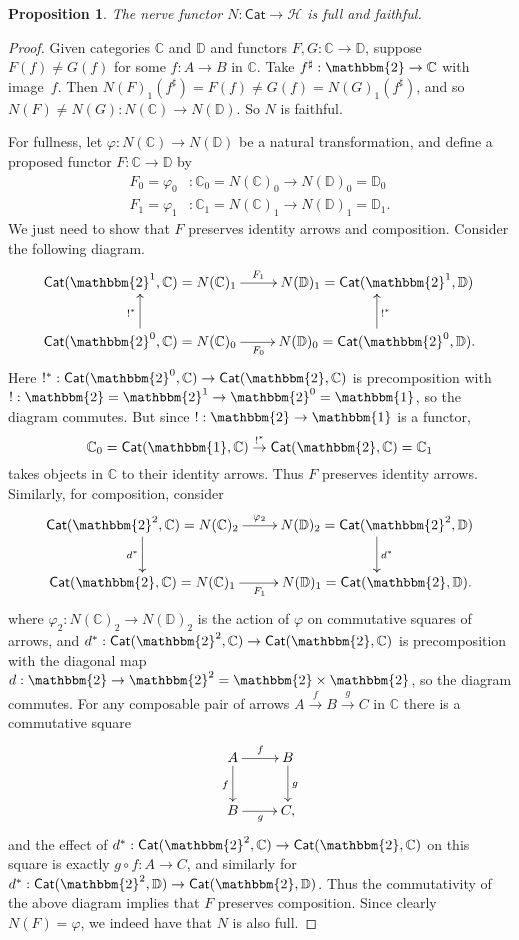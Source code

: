 \documentclass[11pt]{article}
\newcommand{\bbtwo}{\ensuremath{\mathbbm{2}}}
\newcommand{\C}{\ensuremath{\mathbb{C}}}
\newcommand{\D}{\ensuremath{\mathbb{D}}}
\newcommand{\Cat}{\ensuremath{\mathsf{Cat}}}
\newcommand{\HH}{\ensuremath{\mathcal{H}}}
\newtheorem{proposition}[theorem]{Proposition}
\theoremstyle{remark}
\theoremstyle{definition}
\begin{document}
\begin{proposition}
The nerve functor $N : \Cat \to \HH$ is full and faithful.
\end{proposition}
\begin{proof}
Given categories $\C$ and $\D$ and functors $F, G : \C\to\D$, suppose $F(f) \neq G(f)$ for some $f : A\to B$ in $\C$.  Take $f^{\sharp} : \bbtwo \to \C$ with image~$f$.  Then $N(F)_1(f^\sharp) = F(f) \neq G(f) = N(G)_1(f^\sharp)$, and so $N(F) \neq N(G) : N(\C)\to N(\D)$.  So $N$ is faithful.

For fullness, let $\varphi : N(\C) \to N(\D)$ be a natural transformation, and define a proposed functor $F : \C\to \D$ by  
\begin{align*}
F_0 = \varphi_0 &: \C_0 = N(\C)_0 \to N(\D)_0 = \D_0\\
F_1 = \varphi_1 &: \C_1 = N(\C)_1 \to N(\D)_1 = \D_1.
 \end{align*}
We just need to show that $F$ preserves identity arrows and composition.
Consider the following diagram.
\[
\xymatrix{
\Cat(\bbtwo^1, \C) = N(\C)_1 \ar[r]^{F_1} & N(\D)_1 = \Cat(\bbtwo^1, \D) \\
\Cat(\bbtwo^0, \C) = N(\C)_0 \ar[u]^{!^*} \ar[r]_{F_0} & N(\D)_0 = \Cat(\bbtwo^0, \D) \ar[u]_{!^*}.
}
\]
Here $!^* : \Cat(\bbtwo^0, \C) \to \Cat(\bbtwo, \C) $ is precomposition with $! : \bbtwo = \bbtwo^1 \rightarrow \bbtwo^0 = \mathbbm{1}$, so the diagram commutes.  But since $! : \bbtwo \rightarrow \mathbbm{1}$ is a functor, $$\C_0 = \Cat(\mathbbm{1}, \C)  \stackrel{!^*}{\to}  \Cat(\bbtwo, \C) = \C_1$$ takes objects in $\C$ to their identity arrows.  Thus $F$ preserves identity arrows.  Similarly, for composition, consider 
\[
\xymatrix{
\Cat(\bbtwo^2, \C) = N(\C)_2 \ar[d]_{d^*} \ar[r]^{\varphi_2} & N(\D)_2 = \Cat(\bbtwo^2, \D) \ar[d]^{d^*} \\
\Cat(\bbtwo, \C) = N(\C)_1  \ar[r]_{F_1} & N(\D)_1 = \Cat(\bbtwo, \D).
}
\]
where $\varphi_2 : N(\C)_2 \to N(\D)_2$ is the action of $\varphi$ on commutative squares of arrows, and $d^* : \Cat(\bbtwo^2, \C) \to \Cat(\bbtwo, \C)$ is precomposition with the diagonal map $d : \bbtwo \rightarrow \bbtwo^2 = \bbtwo\times\bbtwo$, so the diagram commutes.  For any composable pair of arrows $A \stackrel{f}{\to} B \stackrel{g}{\to} C$ in $\C$ there is a commutative square 
\[
\xymatrix{
A \ar[r]^{f} \ar[d]_{f} & B \ar[d]^{g} \\
B  \ar[r]_{g} & C,
}
\]
and the effect of $d^* : \Cat(\bbtwo^2, \C) \to \Cat(\bbtwo, \C)$ on this square is exactly $g\circ f: A\to C$, and similarly for $d^* : \Cat(\bbtwo^2, \D) \to \Cat(\bbtwo, \D)$.  Thus the commutativity of the above diagram implies that $F$ preserves composition.
Since clearly $N(F) = \varphi$, we indeed have that $N$ is also full.
\end{proof}
\end{document}
